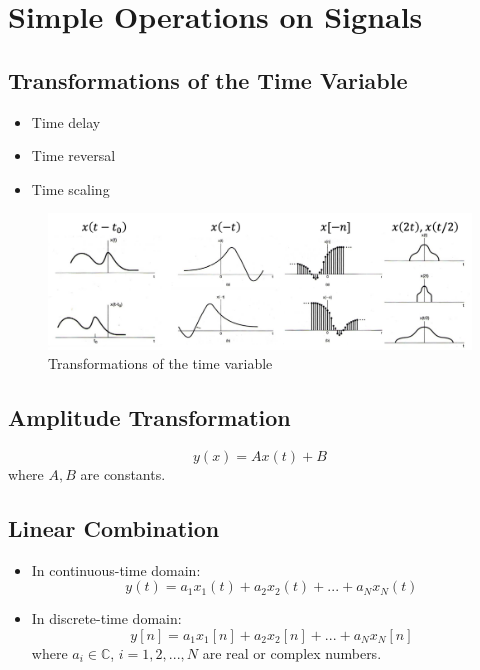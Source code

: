 \documentclass[12pt,a4paper]{article}
\begin{document}
  

\newpage
\section{Simple Operations on Signals}
 \subsection{Transformations of the Time Variable}
 \begin{itemize}
 \item Time delay
 \item Time reversal 
 \item Time scaling
 \end{itemize}
\begin{figure}[H]\centering \includegraphics[width=\textwidth]{images/timetransformation}
  \caption{Transformations of the time variable} \end{figure}
  \subsection{Amplitude Transformation}
  \[ y(x) = Ax(t)+B \]
  \quad where $A,B$ are constants.
\subsection{Linear Combination}
\begin{itemize}
\item In continuous-time domain:
\[ y(t) = a_{1}x_{1}(t)+a_{2}x_{2}(t)+...+a_{N}x_{N}(t) \]
\item In discrete-time domain:
\[ y[n] = a_{1}x_{1}[n]+a_{2}x_{2}[n]+...+a_{N}x_{N}[n] \]
 \quad where $a_{i} \in \mathbb{C}$, $i=1,2,...,N$ are real or complex numbers.
\end{itemize}
\end{document}
